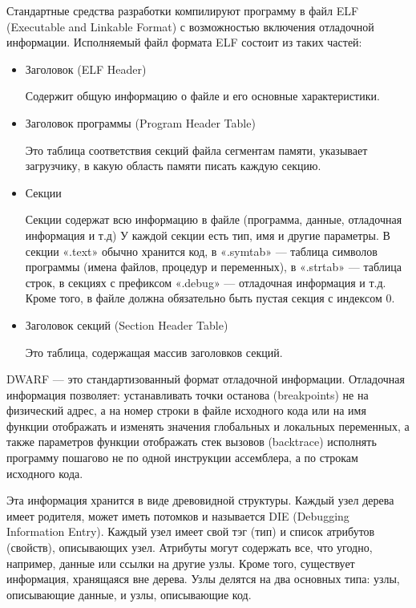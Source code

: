 \documentclass[a4paper,14pt,oneside]{extreport}  %
\begin{document}
Стандартные средства разработки компилируют программу в файл ELF (Executable and Linkable Format) с возможностью включения отладочной информации.
Исполняемый файл формата ELF состоит из таких частей:
	\begin{itemize}
	\item Заголовок (ELF Header)
	
	Содержит общую информацию о файле и его основные характеристики.
	\item Заголовок программы (Program Header Table)
	
	Это таблица соответствия секций файла сегментам памяти, указывает загрузчику, в какую область памяти писать каждую секцию.
	\item Секции
	
	Секции содержат всю информацию в файле (программа, данные, отладочная информация и т.д)
	У каждой секции есть тип, имя и другие параметры. В секции «.text» обычно хранится код, в «.symtab» — таблица символов программы (имена файлов, процедур и переменных), в «.strtab» — таблица строк, в секциях с префиксом «.debug» — отладочная информация и т.д. Кроме того, в файле должна обязательно быть пустая секция с индексом 0.
	\item Заголовок секций (Section Header Table)
	
	Это таблица, содержащая массив заголовков секций.\\
    \end{itemize}

	DWARF — это стандартизованный формат отладочной информации.
	Отладочная информация позволяет:
	устанавливать точки останова (breakpoints) не на физический адрес, а на номер строки в файле исходного кода или на имя функции
	отображать и изменять значения глобальных и локальных переменных, а также параметров функции
	отображать стек вызовов (backtrace)
	исполнять программу пошагово не по одной инструкции ассемблера, а по строкам исходного кода.
	
	Эта информация хранится в виде древовидной структуры. Каждый узел дерева имеет родителя, может иметь потомков и называется DIE (Debugging Information Entry). Каждый узел имеет свой тэг (тип) и список атрибутов (свойств), описывающих узел. Атрибуты могут содержать все, что угодно, например, данные или ссылки на другие узлы. Кроме того, существует информация, хранящаяся вне дерева.
	Узлы делятся на два основных типа: узлы, описывающие данные, и узлы, описывающие код.
\end{document}
